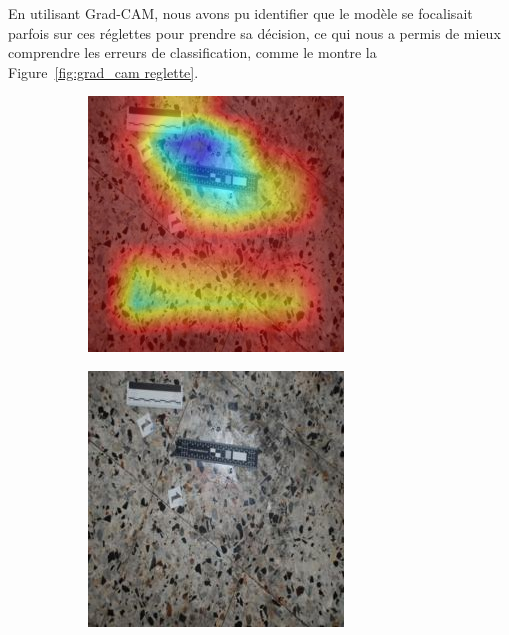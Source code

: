 En utilisant Grad-CAM, nous avons pu identifier que le modèle se focalisait parfois sur ces réglettes pour prendre sa décision, ce qui nous a permis de mieux comprendre les erreurs de classification, comme le montre la Figure~\ref{fig:grad_cam reglette}.

\begin{figure}[ht]
    \centering
    \begin{subfigure}{0.40\linewidth}
        \centering
        \includegraphics[width=\linewidth]{../asset/exemple/attention_reglette.jpg}
    \end{subfigure}
    \begin{subfigure}{0.40\linewidth}
        \centering
        \includegraphics[width=\linewidth]{../asset/exemple/attention_reglette_image.jpg}

\end{subfigure}
\end{figure}
